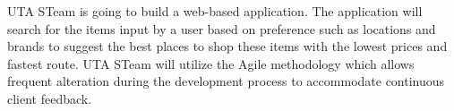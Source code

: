 UTA STeam is going to build a web-based application. The application will search for the items input by a user based on preference such as locations and brands to suggest the best places to shop these items with the lowest prices and fastest route. UTA STeam will utilize the Agile methodology which allows frequent alteration during the development process to accommodate continuous client feedback.